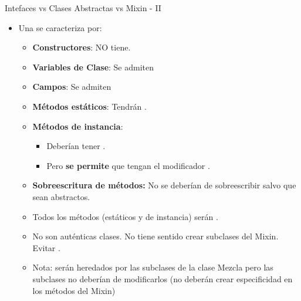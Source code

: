\documentclass[10pt, envcountsect , spanish]{beamer}
\begin{document}
\begin{frame}{Intefaces vs Clases Abstractas vs Mixin - II}

\Large 

\begin{itemize}

\item Una  se caracteriza por:
\begin{itemize} \large
\item \textbf{Constructores}: NO tiene.

\item \textbf{Variables de Clase}: Se admiten

\item \textbf{Campos}: Se admiten

\item \textbf{Métodos estáticos}: Tendrán . 
\item \textbf{Métodos de instancia}: 
	\begin{itemize} \normalsize
	\item Deberían tener . 
	\item Pero \textbf{se permite} que  tengan el modificador .
	\end{itemize}

\item \textbf{Sobreescritura de métodos:} No se deberían de sobreescribir salvo que sean abstractos.

\item Todos los métodos (estáticos y de instancia) serán  .

\item No son auténticas clases. No tiene sentido crear subclases del Mixin. Evitar  .


\item Nota: serán heredados por las subclases de la clase Mezcla pero las subclases no deberían de modificarlos (no deberán crear especificidad en los métodos del Mixin)

\end{itemize}

\end{itemize}

\end{frame}
\end{document}
